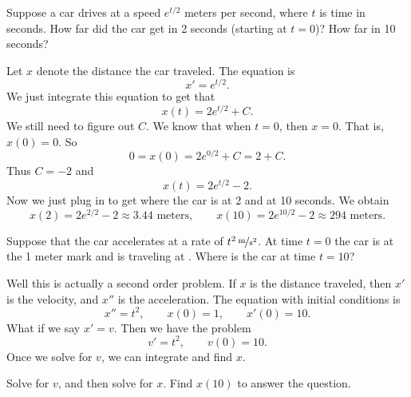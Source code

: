 \begin{example}
Suppose a car drives at a speed $e^{t/2}$ meters per second,
where $t$ is time in seconds.
How far did the car get in 2 seconds (starting at $t=0$)?  How far in 10 seconds?

Let $x$ denote the distance the car traveled.
The equation is
\begin{equation*}
x' = e^{t/2} .
\end{equation*}
We just integrate this equation to get that
\begin{equation*}
x(t) = 2 e^{t/2} + C . 
\end{equation*}
We still need to figure out $C$.  We know that when $t=0$, then
$x=0$.  That is, $x(0) = 0$.  So
\begin{equation*}
0 = x(0) = 2e^{0/2} + C = 2 + C .
\end{equation*}
Thus $C = -2$ and 
\begin{equation*}
x(t) = 2 e^{t/2} - 2 .
\end{equation*}
Now we just plug in to get where the car is at 2 and at 10 seconds.
We obtain
\begin{equation*}
x(2) = 2e^{2/2} - 2 \approx 3.44 \text{ meters} ,
\qquad
x(10) = 2e^{10/2} - 2 \approx 294 \text{ meters} .
\end{equation*}
\end{example}

\begin{example}
Suppose that the car accelerates at a rate of $\unitfrac[t^2]{m}{s^2}$.
At time $t=0$ the car is at the 1 meter mark and is traveling at
.  Where is the car at time $t=10$?

Well this is actually a second order problem.  If $x$ is the distance
traveled, then $x'$ is the velocity, and $x''$ is the acceleration.
The equation with initial conditions is
\begin{equation*}
x'' = t^2 , \qquad x(0) = 1 , \qquad x'(0) = 10 .
\end{equation*}
What if we say $x' = v$.  Then we have the problem
\begin{equation*}
v' = t^2, \qquad v(0) = 10 .
\end{equation*}
Once we solve for $v$, we can integrate and find $x$.
\end{example}

\begin{exercise}
Solve for $v$, and then solve for $x$.  Find $x(10)$ to answer the
question.
\end{exercise}


